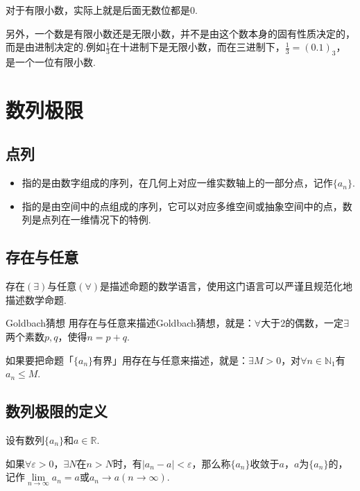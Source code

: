对于有限小数，实际上就是后面无数位都是$0$.

另外，一个数是有限小数还是无限小数，并不是由这个数本身的固有性质决定的，而是由进制决定的.例如$\frac{1}{3}$在十进制下是无限小数，而在三进制下，$\frac{1}{3} = (0.1)_3$，是一个一位有限小数.


\section{数列极限}
\subsection{点列}
\begin{definition}
    \begin{itemize}
        \item {}指的是由数字组成的序列，在几何上对应一维实数轴上的一部分点，记作$\{a_n\}$.
        \item {}指的是由空间中的点组成的序列，它可以对应多维空间或抽象空间中的点，数列是点列在一维情况下的特例.
    \end{itemize}
\end{definition}


\subsection{存在与任意}
存在$(\exists)$与任意$(\forall)$是描述命题的数学语言，使用这门语言可以严谨且规范化地描述数学命题.
\begin{extension}{Goldbach猜想}
    用存在与任意来描述Goldbach猜想，就是：$\forall$大于$2$的偶数，一定$\exists$两个素数$p,q$，使得$n=p+q$.
\end{extension}

如果要把命题「$\{a_n\}$有界」用存在与任意来描述，就是：$\exists M>0$，对$\forall n \in \mathbb{N}_1$有$a_n \leqslant M$.


\subsection{数列极限的定义}
\begin{definition}
    设有数列$\{a_n\}$和$a \in \mathbb{R}$.

    如果$\forall \varepsilon > 0$，$\exists N$在$n > N$时，有$|a_n - a|<\varepsilon$，那么称$\{a_n\}$收敛于$a$，$a$为$\{a_n\}$的，记作$\lim\limits_{n \to \infty}a_n=a$或$a_n \to a(n \to \infty)$.
\end{definition}

